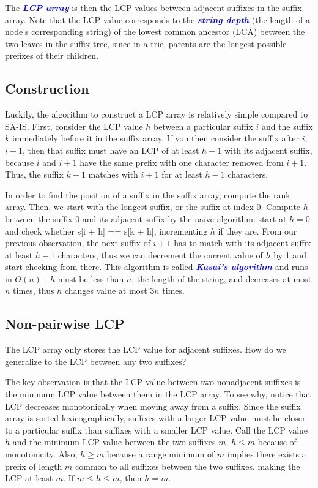 \documentclass[11pt, oneside]{article}
\newcommand{\emphasis}[1]{\textcolor{blue}{\textbf{\textit{#1}}}}
\begin{document}
The \emphasis{LCP array} is then the LCP values between adjacent suffixes in the suffix array.
Note that the LCP value corresponds to the \emphasis{string depth}
(the length of a node's corresponding string)
of the lowest common ancestor (LCA) between the two leaves in the suffix tree,
since in a trie, parents are the longest possible prefixes of their children.

\subsection{Construction}

Luckily, the algorithm to construct a LCP array is relatively simple compared to SA-IS.
First, consider the LCP value \( h \) between a particular suffix \( i \)
and the suffix \( k \) immediately before it in the suffix array.
If you then consider the suffix after \( i \), \( i + 1 \), then that suffix must
have an LCP of at least \( h - 1 \) with its adjacent suffix, because \( i \) and \( i + 1 \)
have the same prefix with one character removed from \( i + 1 \). Thus, the
suffix \( k + 1 \) matches with \( i + 1 \) for at least \( h - 1 \) characters.

In order to find the position of a suffix in the suffix array, compute the rank array.
Then, we start with the longest suffix, or the suffix at index 0.
Compute \( h \) between the suffix 0 and its adjacent suffix by the naïve algorithm: start at \( h = 0 \) and check whether s[i + h] == s[k + h], incrementing \( h \) if they are.
From our previous observation, the next suffix of \( i + 1 \) has to match with its adjacent suffix
at least \( h - 1 \) characters, thus we can decrement the current value of \( h \)
by 1 and start checking from there. This algorithm is called \emphasis{Kasai's algorithm} and runs in \( O(n) \) - \( h \) must be less than \( n \), the length
of the string, and decreases at most \( n \) times, thus \( h \) changes value
at most \( 3n \) times.

\subsection{Non-pairwise LCP}

The LCP array only stores the LCP value for adjacent suffixes.
How do we generalize to the LCP between any two suffixes?

The key observation is that the LCP value between two nonadjacent suffixes
is the minimum LCP value between them in the LCP array.
To see why, notice that LCP decreases monotonically when moving away from a suffix.
Since the suffix array is sorted lexicographically, suffixes with a larger LCP
value must be closer to a particular suffix than suffixes with a smaller LCP value.
Call the LCP value \( h \) and the minimum LCP value between the two suffixes \( m \).
\( h \leq m \) because of monotonicity.
Also, \( h \geq m \) because a range minimum of \( m \) implies there exists a prefix of length \( m \)
common to all suffixes between the two suffixes, making the LCP at least \( m \).
If \( m \leq h \leq m \), then \( h = m \).
\end{document}
